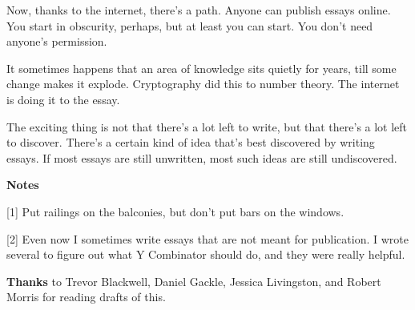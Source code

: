 Now, thanks to the internet, there's a
                  path. Anyone can publish essays online. You start in
                  obscurity, perhaps, but at least you can start. You don't need
                  anyone's permission.

It sometimes happens that an
                  area of knowledge sits quietly for years, till some change
                  makes it explode. Cryptography did this to number theory. The
                  internet is doing it to the essay.

The exciting
                  thing is not that there's a lot left to write, but that
                  there's a lot left to discover. There's a certain kind of idea
                  that's best discovered by writing essays. If most essays are
                  still unwritten, most such ideas are still undiscovered.









\textbf{Notes}

[1] Put railings on the balconies, but don't put
                  bars on the windows.

[2] Even now I sometimes write
                  essays that are not meant for publication. I wrote several to
                  figure out what Y Combinator should do, and they were really
                  helpful.



\textbf{Thanks} to Trevor
                  Blackwell, Daniel Gackle, Jessica Livingston, and Robert
                  Morris for reading drafts of this.


              
            
          
